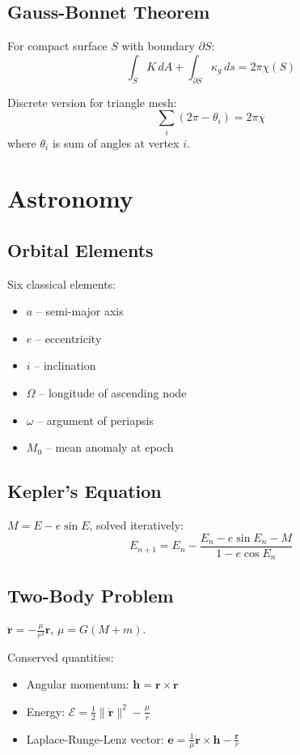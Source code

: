 \subsection{Gauss-Bonnet Theorem}

For compact surface $S$ with boundary $\partial S$:
\[
\int_S K\, dA + \int_{\partial S} \kappa_g\, ds = 2\pi \chi(S)
\]

Discrete version for triangle mesh:
\[
\sum_i (2\pi - \theta_i) = 2\pi \chi
\]
where $\theta_i$ is sum of angles at vertex $i$.

\section{Astronomy}

\subsection{Orbital Elements}

Six classical elements:
\begin{itemize}
    \item $a$ -- semi-major axis
    \item $e$ -- eccentricity
    \item $i$ -- inclination
    \item $\Omega$ -- longitude of ascending node
    \item $\omega$ -- argument of periapsis
    \item $M_0$ -- mean anomaly at epoch
\end{itemize}

\subsection{Kepler's Equation}

$M = E - e \sin E$, solved iteratively:
\[
E_{n+1} = E_n - \frac{E_n - e\sin E_n - M}{1 - e\cos E_n}
\]

\subsection{Two-Body Problem}

$\ddot{\mathbf{r}} = -\frac{\mu}{r^3} \mathbf{r}$, $\mu = G(M+m)$.

Conserved quantities:
\begin{itemize}
    \item Angular momentum: $\mathbf{h} = \mathbf{r} \times \dot{\mathbf{r}}$
    \item Energy: $\mathcal{E} = \frac{1}{2}\|\dot{\mathbf{r}}\|^2 - \frac{\mu}{r}$
    \item Laplace-Runge-Lenz vector: $\mathbf{e} = \frac{1}{\mu}\dot{\mathbf{r}} \times \mathbf{h} - \frac{\mathbf{r}}{r}$
\end{itemize}

